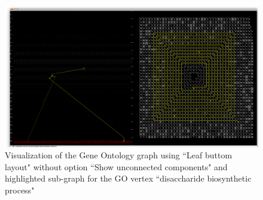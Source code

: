 \newpage
\begin{figure}[h!]
\centering
\includegraphics[scale=0.33, angle=90]{pictures/screenshot_6.png}
\caption{Visualization of the Gene Ontology graph using ``Leaf buttom layout" without option ``Show unconnected components" and highlighted sub-graph for the GO vertex ``disaccharide biosynthetic process"}
\end{figure}